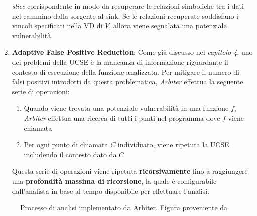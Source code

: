 \documentclass[../main.tex]{subfiles}
\begin{document}
\begin{enumerate}
    \textit{slice} corrispondente in modo da recuperare le relazioni simboliche tra i dati nel cammino dalla sorgente al sink. Se le relazioni recuperate soddisfano i vincoli specificati nella VD di $V$, allora viene
    segnalata una potenziale vulnerabilità.
    \item \textbf{Adaptive False Positive Reduction}: Come già discusso nel \textit{capitolo 4}, uno dei problemi della UCSE è la mancanza di informazione riguardante il contesto di esecuzione della funzione analizzata. Per mitigare
    il numero di falsi positivi introdotti da questa problematica, \textit{Arbiter} effettua la seguente serie di operazioni:
    \begin{enumerate}
        \item Quando viene trovata una potenziale vulnerabilità in una funzione $f$, \textit{Arbiter} effettua una ricerca di tutti i punti nel programma dove $f$ viene chiamata
        \item Per ogni punto di chiamata $C$ individuato, viene ripetuta la UCSE includendo il contesto dato da $C$
    \end{enumerate}
    Questa serie di operazioni viene ripetuta \textbf{ricorsivamente} fino a raggiungere una \textbf{profondità massima di ricorsione}, la quale è configurabile dall'analista in base al tempo disponibile per effettuare l'analisi.
\end{enumerate}
\begin{figure}[H]
  \caption{Processo di analisi implementato da Arbiter. Figura proveniente da \cite{Arbier}}
  \label{fig:key}
\end{figure}
\end{document}
